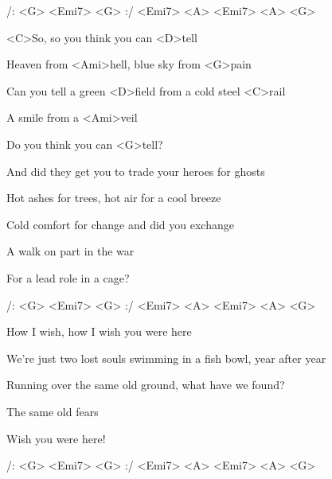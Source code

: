 
/: <G> <Emi7> <G> :/ <Emi7> <A> <Emi7> <A> <G>

\zs
<C>So, so you think you can <D>tell

Heaven from <Ami>hell, blue sky from <G>pain

Can you tell a green <D>field from a cold steel <C>rail

A smile from a <Ami>veil

Do you think you can <G>tell?
\ks

\zs
And did they get you to trade your heroes for ghosts

Hot ashes for trees, hot air for a cool breeze

Cold comfort for change
and did you exchange

A walk on part in the war

For a lead role in a cage?
\ks

/: <G> <Emi7> <G> :/ <Emi7> <A> <Emi7> <A> <G>

\zs
How I wish, how I wish you were here

We're just two lost souls swimming in a fish bowl, year after year

Running over the same old ground, what have we found?

The same old fears

Wish you were here!
\ks

/: <G> <Emi7> <G> :/ <Emi7> <A> <Emi7> <A> <G>


\kp



















